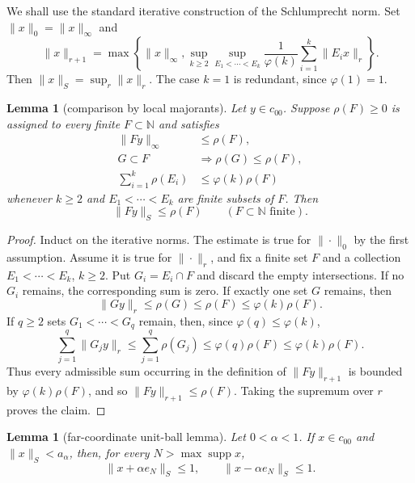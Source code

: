 \documentclass[11pt]{article}
\newtheorem{lemma}[theorem]{Lemma}
\newcommand{\N}{\mathbb N}
\newcommand{\ph}{\varphi}
\DeclareMathOperator{\supp}{supp}
\begin{document}
We shall use the standard iterative construction of the Schlumprecht norm.  Set
$\|x\|_0=\|x\|_\infty$ and
\[
 \|x\|_{r+1}=\max\left\{\|x\|_\infty,
 \sup_{k\ge 2}\sup_{E_1<\cdots<E_k}
 \frac1{\ph(k)}\sum_{i=1}^k\|E_i x\|_r\right\}.
\]
Then $\|x\|_S=\sup_r\|x\|_r$.  The case $k=1$ is redundant, since $\ph(1)=1$.

\begin{lemma}[comparison by local majorants]
Let $y\in c_{00}$.  Suppose $\rho(F)\ge 0$ is assigned to every finite $F\subset\N$ and satisfies
\begin{align*}
 \|Fy\|_\infty&\le \rho(F),\\
 G\subset F&\Longrightarrow \rho(G)\le \rho(F),\\
 \sum_{i=1}^k\rho(E_i)&\le \ph(k)\rho(F)
\end{align*}
whenever $k\ge 2$ and $E_1<\cdots<E_k$ are finite subsets of $F$.  Then
\[
 \|Fy\|_S\le \rho(F)
 \qquad(F\subset\N\text{ finite}).
\]
\end{lemma}

\begin{proof}
Induct on the iterative norms.  The estimate is true for $\|\cdot\|_0$ by the first assumption.
Assume it is true for $\|\cdot\|_r$, and fix a finite set $F$ and a collection
$E_1<\cdots<E_k$, $k\ge 2$.  Put $G_i=E_i\cap F$ and discard the empty intersections.
If no $G_i$ remains, the corresponding sum is zero.  If exactly one set $G$ remains, then
\[
 \|Gy\|_r\le \rho(G)\le \rho(F)\le \ph(k)\rho(F).
\]
If $q\ge 2$ sets $G_1<\cdots<G_q$ remain, then, since $\ph(q)\le \ph(k)$,
\[
 \sum_{j=1}^q\|G_jy\|_r
 \le \sum_{j=1}^q\rho(G_j)
 \le \ph(q)\rho(F)
 \le \ph(k)\rho(F).
\]
Thus every admissible sum occurring in the definition of $\|Fy\|_{r+1}$ is bounded by
$\ph(k)\rho(F)$, and so $\|Fy\|_{r+1}\le \rho(F)$.  Taking the supremum over $r$ proves the
claim.
\end{proof}

\begin{lemma}[far-coordinate unit-ball lemma]
Let $0<\alpha<1$.  If $x\in c_{00}$ and $\|x\|_S<a_\alpha$, then, for every
$N>\max\supp x$,
\[
 \|x+\alpha e_N\|_S\le 1,
 \qquad
 \|x-\alpha e_N\|_S\le 1.
\]
\end{lemma}
\end{document}
